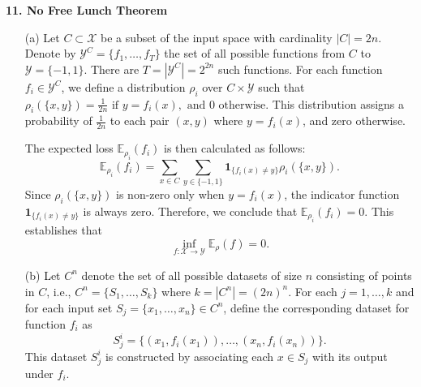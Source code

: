 \documentclass{article}
\begin{document}
\vspace{0.5cm}

\vspace{0.5cm}
\noindent\textbf{11. No Free Lunch Theorem}
\vspace{0.5cm}

\begin{itemize}
    \item[(a)] Let \( C \subset \mathcal{X} \) be a subset of the input space with cardinality \( |C| = 2n \). Denote by \( \mathcal{Y}^C = \{f_1, \dots, f_T\} \) the set of all possible functions from \( C \) to \( \mathcal{Y} = \{-1, 1\} \). There are \( T = |\mathcal{Y}^C| = 2^{2n} \) such functions. For each function \( f_i \in \mathcal{Y}^C \), we define a distribution \( \rho_i \) over \( C \times \mathcal{Y} \) such that
    \( \rho_i(\{x, y\}) = \frac{1}{2n} \text{ if } y = f_i(x), \text{ and } 0 \text{ otherwise} \).
    This distribution assigns a probability of \( \frac{1}{2n} \) to each pair \( (x, y) \) where \( y = f_i(x) \), and zero otherwise.
    
    The expected loss \( \mathbb{E}_{\rho_i}(f_i) \) is then calculated as follows:
    \[
    \mathbb{E}_{\rho_i}(f_i) = \sum_{x \in C} \sum_{y \in \{-1, 1\}} \mathbf{1}_{\{f_i(x) \neq y\}} \rho_i(\{x, y\}).
    \]
    Since \( \rho_i(\{x, y\}) \) is non-zero only when \( y = f_i(x) \), the indicator function \( \mathbf{1}_{\{f_i(x) \neq y\}} \) is always zero. Therefore, we conclude that \( \mathbb{E}_{\rho_i}(f_i) = 0 \). This establishes that
    \[
    \inf_{f: \mathcal{X} \rightarrow \mathcal{Y}} \mathbb{E}_\rho(f) = 0.
    \]
    \item[(b)] Let \( C^n \) denote the set of all possible datasets of size \( n \) consisting of points in \( C \), i.e., \( C^n = \{S_1, \dots, S_k\} \) where \( k = |C^n| = (2n)^n \). For each \( j = 1, \dots, k \) and for each input set \( S_j = \{x_1, \dots, x_n\} \in C^n \), define the corresponding dataset for function \( f_i \) as
    \[
    S_j^i = \{(x_1, f_i(x_1)), \dots, (x_n, f_i(x_n))\}.
    \]
    This dataset \( S_j^i \) is constructed by associating each \( x \in S_j \) with its output under \( f_i \).
    

\end{itemize}
\end{document}
